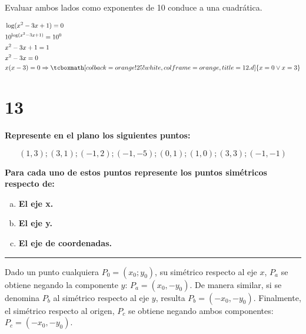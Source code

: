 \documentclass{article}
\newcommand{\hresult}[2]{\tcboxmath[colback=orange!25!white,colframe=orange, title=#1] {#2} }
\begin{document}
Evaluar ambos lados como exponentes de 10 conduce a una cuadrática.

\begin{subequations}
\begin{align}
& \log(x^2 - 3x + 1) = 0 \\
& 10^{\log(x^2 - 3x + 1)} = 10^0 \\
& x^2 - 3x + 1 = 1 \\
& x^2 - 3x = 0 \\
& x (x-3) = 0 \Rightarrow \hresult{12.d}{ x = 0 \vee x = 3 }
\end{align}
\end{subequations}

\section*{13}
\label{sec:13}

\textbf{Represente en el plano los siguientes puntos:}

\begin{equation}
(1, 3); (3, 1); (-1, 2); (-1, -5); (0, 1); (1, 0); (3, 3); (-1, -1)
\end{equation}

\textbf{Para cada uno de estos puntos represente los puntos simétricos respecto de:}

\begin{enumerate}[(a)]
\bfseries

\item \textbf{El eje x.}

\item \textbf{El eje y.}

\item \textbf{El eje de coordenadas.}

\end{enumerate}
\hrule
\vspace{1em}
Dado un punto cualquiera $P_0 = (x_0; y_0)$, su simétrico respecto al eje $x$, $P_a$ se obtiene negando la componente $y$: $P_a = (x_0, -y_0)$. De manera similar, si se denomina $P_b$ al simétrico respecto al eje $y$, resulta $P_b = (-x_0, -y_0)$. Finalmente, el simétrico respecto al origen, $P_c$ se obtiene negando ambos componentes: $P_c = (-x_0, -y_0)$.
\end{document}
